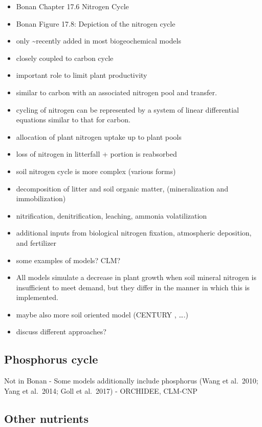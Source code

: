\documentclass[
  oneside]{book}
\begin{document}
\begin{itemize}
\item
  Bonan Chapter 17.6 Nitrogen Cycle
\item
  Bonan Figure 17.8: Depiction of the nitrogen cycle
\item
  only \textasciitilde recently added in most biogeochemical models
\item
  closely coupled to carbon cycle
\item
  important role to limit plant productivity
\item
  similar to carbon with an associated nitrogen pool and transfer.
\item
  cycling of nitrogen can be represented by a system of linear differential equations similar to that for carbon.
\item
  allocation of plant nitrogen uptake up to plant pools
\item
  loss of nitrogen in litterfall + portion is reabsorbed
\item
  soil nitrogen cycle is more complex (various forms)
\item
  decomposition of litter and soil organic matter, (mineralization and immobilization)
\item
  nitrification, denitrification, leaching, ammonia volatilization
\item
  additional inputs from biological nitrogen fixation, atmospheric deposition, and fertilizer
\item
  some examples of models? CLM?
\item
  All models simulate a decrease in plant growth when soil mineral nitrogen is insufficient to meet demand, but they differ in the manner in which this is implemented.
\item
  maybe also more soil oriented model (CENTURY , \ldots.)
\item
  discuss different approaches?
\end{itemize}

\hypertarget{phosphorus-cycle}{%
\subsection{Phosphorus cycle}\label{phosphorus-cycle}}

Not in Bonan
- Some models additionally include phosphorus (Wang et al.~2010; Yang et al.~2014; Goll et al.~2017)
- ORCHIDEE, CLM-CNP

\hypertarget{other-nutrients}{%
\subsection{Other nutrients}\label{other-nutrients}}
\end{document}
